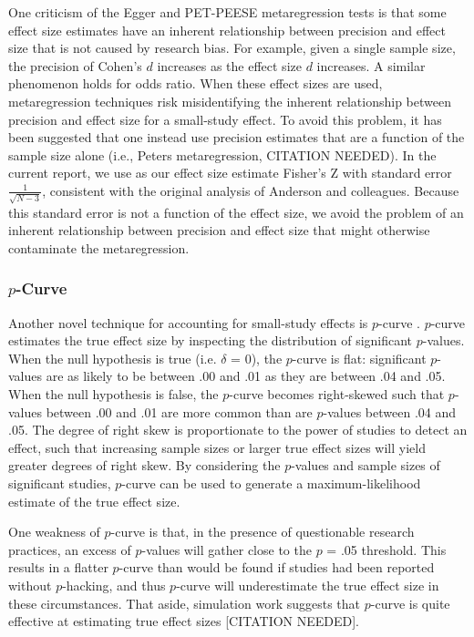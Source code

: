\documentclass[man]{apa6}
\begin{document}
One criticism of the Egger and PET-PEESE metaregression tests is that some effect size estimates have an inherent relationship between precision and effect size that is not caused by research bias. For example, given a single sample size, the precision of Cohen's $d$ increases as the effect size $d$ increases. A similar phenomenon holds for odds ratio. When these effect sizes are used, metaregression techniques risk misidentifying the inherent relationship between precision and effect size for a small-study effect. To avoid this problem, it has been suggested that one instead use precision estimates that are a function of the sample size alone (i.e., Peters metaregression, CITATION NEEDED). In the current report, we use as our effect size estimate Fisher's Z with standard error $\frac{1}{\sqrt{N-3}}$, consistent with the original analysis of Anderson and colleagues. Because this standard error is not a function of the effect size, we avoid the problem of an inherent relationship between precision and effect size that might otherwise contaminate the metaregression.

\subsubsection{$p$-Curve}
Another novel technique for accounting for small-study effects is $p$-curve \citep{Simonsohn:etal:2014}. $p$-curve estimates the true effect size by inspecting the distribution of significant $p$-values. When the null hypothesis is true (i.e. $\delta$ = 0), the $p$-curve is flat: significant $p$-values are as likely to be between .00 and .01 as they are between .04 and .05. When the null hypothesis is false, the $p$-curve becomes right-skewed such that $p$-values between .00 and .01 are more common than are $p$-values between .04 and .05. The degree of right skew is proportionate to the power of studies to detect an effect, such that increasing sample sizes or larger true effect sizes will yield greater degrees of right skew. By considering the $p$-values and sample sizes of significant studies, $p$-curve can be used to generate a maximum-likelihood estimate of the true effect size.

One weakness of $p$-curve is that, in the presence of questionable research practices, an excess of $p$-values will gather close to the $p$ = .05 threshold. This results in a flatter $p$-curve than would be found if studies had been reported without $p$-hacking, and thus $p$-curve will underestimate the true effect size in these circumstances. That aside, simulation work suggests that $p$-curve is quite effective at estimating true effect sizes [CITATION NEEDED].
\end{document}
